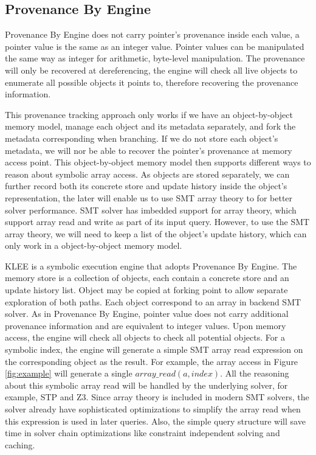\documentclass[sigplan, nonacm]{acmart}\settopmatter{printfolios=true,printccs=false,printacmref=false}
\newcommand{\klee}{\textsc{KLEE}\xspace}
\begin{document}
\subsection[]{Provenance By Engine}
Provenance By Engine does not carry pointer's provenance inside each value, a pointer value is the same as an integer value. Pointer values can be manipulated the same way as integer for arithmetic, byte-level manipulation. The provenance will only be recovered at dereferencing, the engine will check all live objects to enumerate all possible objects it points to, therefore recovering the provenance information.\par
This provenance tracking approach only works if we have an object-by-object memory model, manage each object and its metadata separately, and fork the metadata corresponding when branching. If we do not store each object's metadata, we will nor be able to recover the pointer's provenance at memory access point. This object-by-object memory model then supports different ways to reason about symbolic array access. As objects are stored separately, we can further record both its concrete store and update history inside the object's representation, the later will enable us to use SMT array theory to for better solver performance. SMT solver has imbedded support for array theory, which support array read and write as part of its input query. However, to use the SMT array theory, we will need to keep a list of the object's update history, which can only work in a object-by-object memory model.\par
\klee is a symbolic execution engine that adopts Provenance By Engine. The memory store is a collection of objects, each contain a concrete store and an update history list. Object may be copied at forking point to allow separate exploration of both paths. Each object correspond to an array in backend SMT solver. As in Provenance By Engine, pointer value does not carry additional provenance information and are equivalent to integer values. Upon memory access, the engine will check all objects to check all potential objects. For a symbolic index, the engine will generate a simple SMT array read expression on the corresponding object as the result. For example, the array access in Figure \ref{fig:example} will generate a single $array\_read(a, index)$. All the reasoning about this symbolic array read will be handled by the underlying solver, for example, STP and Z3. Since array theory is included in modern SMT solvers, the solver already have sophisticated optimizations to simplify the array read when this expression is used in later queries. Also, the simple query structure will save time in solver chain optimizations like constraint independent solving and caching.
\end{document}

